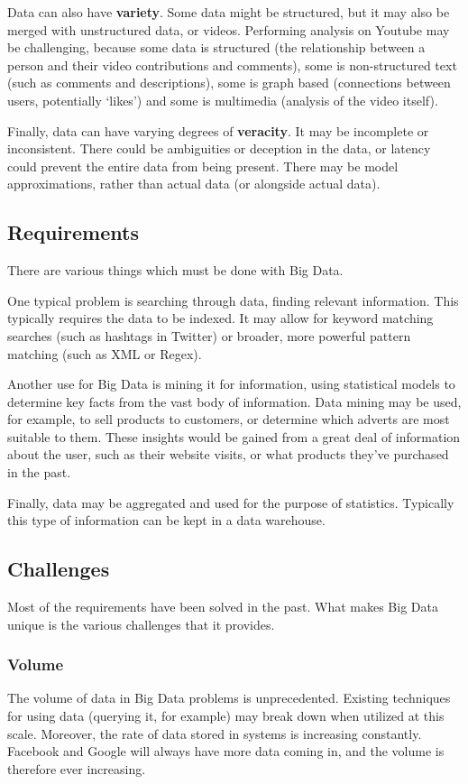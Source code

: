\documentclass{article}
\begin{document}
{\begin{itemize}
Data can also have \textbf{variety}. Some data might be structured, but it may also be merged with unstructured data, or videos. Performing analysis on Youtube may be challenging, because some data is structured (the relationship between a person and their video contributions and comments), some is non-structured text (such as comments and descriptions), some is graph based (connections between users, potentially `likes') and some is multimedia (analysis of the video itself). 

Finally, data can have varying degrees of \textbf{veracity}. It may be incomplete or inconsistent. There could be ambiguities or deception in the data, or latency could prevent the entire data from being present. There may be model approximations, rather than actual data (or alongside actual data). 

\subsection{Requirements}
There are various things which must be done with Big Data.

One typical problem is searching through data, finding relevant information. This typically requires the data to be indexed. It may allow for keyword matching searches (such as hashtags in Twitter) or broader, more powerful pattern matching (such as XML or Regex).

Another use for Big Data is mining it for information, using statistical models to determine key facts from the vast body of information. Data mining may be used, for example, to sell products to customers, or determine which adverts are most suitable to them. These insights would be gained from a great deal of information about the user, such as their website visits, or what products they've purchased in the past.

Finally, data may be aggregated and used for the purpose of statistics. Typically this type of information can be kept in a data warehouse.

\subsection{Challenges}
Most of the requirements have been solved in the past. What makes Big Data unique is the various challenges that it provides.

\subsubsection{Volume}
The volume of data in Big Data problems is unprecedented. Existing techniques for using data (querying it, for example) may break down when utilized at this scale. Moreover, the rate of data stored in systems is increasing constantly. Facebook and Google will always have more data coming in, and the volume is therefore ever increasing.


\end{itemize}}
\end{document}
